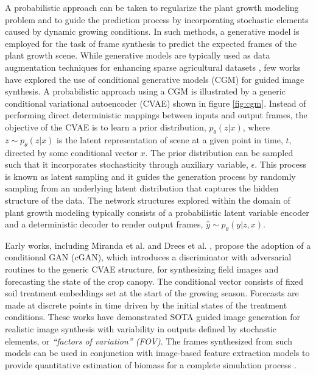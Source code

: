 \documentclass{article}
\begin{document}
A probabilistic approach can be taken to regularize the plant growth modeling problem and to guide the prediction process by incorporating stochastic elements caused by dynamic growing conditions. In such methods, a generative model is employed for the task of frame synthesis to predict the expected frames of the plant growth scene. While generative models are typically used as data augmentation techniques for enhancing sparse agricultural datasets \cite{doi:10.34133/plantphenomics.0041, LU2022107208}, few works have explored the use of conditional generative models (CGM) for guided image synthesis. A probabilistic approach using a CGM is illustrated by a generic conditional variational autoencoder (CVAE) shown in figure \ref{fig:cgm}. Instead of performing direct deterministic mappings between inputs and output frames, the objective of the CVAE is to learn a prior distribution, $p_\theta(z|x)$, where $z\sim p_\theta(z|x)$ is the latent representation of scene at a given point in time, $t$, directed by some conditional vector $x$. The prior distribution can be sampled such that it incorporates stochasticity through auxiliary variable, $\epsilon$. This process is known as latent sampling and it guides the generation process by  randomly sampling from an underlying latent distribution that captures the hidden structure of the data. The network structures explored within the domain of plant growth modeling typically consists of a probabilistic latent variable encoder and a deterministic decoder to render output frames, $\hat{y} \sim p_\theta(y|z,x)$.

Early works, including Miranda et al. \cite{9956115} and Drees et al. \cite{DREES2021106415}, propose the adoption of a conditional GAN (cGAN), which introduces a discriminator with adversarial routines to the generic CVAE structure, for synthesizing field images and forecasting the state of the crop canopy. The conditional vector consists of fixed soil treatment embeddings set at the start of the growing season. Forecasts are made at discrete points in time driven by the initial states of the treatment conditions. These works have demonstrated SOTA guided image generation for realistic image synthesis with variability in outputs defined by stochastic elements, or \textit{``factors of variation'' (FOV)}. The frames synthesized from such models can be used in conjunction with image-based feature extraction models to provide quantitative estimation of biomass for a complete simulation process \cite{10.1007/978-3-031-16788-1_29}.
\end{document}
